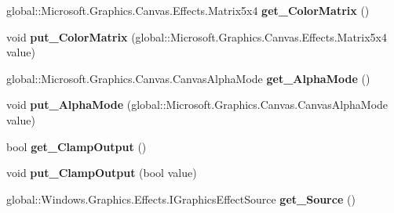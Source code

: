 \begin{DoxyCompactItemize}
global\+::\+Microsoft.\+Graphics.\+Canvas.\+Effects.\+Matrix5x4 {\bfseries get\+\_\+\+Color\+Matrix} ()
\item 
\mbox{\label{class_microsoft_1_1_graphics_1_1_canvas_1_1_effects_1_1_color_matrix_effect_a7d95e32f42f71f48b84cc81284f1023f}} 
void {\bfseries put\+\_\+\+Color\+Matrix} (global\+::\+Microsoft.\+Graphics.\+Canvas.\+Effects.\+Matrix5x4 value)
\item 
\mbox{\label{class_microsoft_1_1_graphics_1_1_canvas_1_1_effects_1_1_color_matrix_effect_abfdb6c68cffed7e33d14c5dac4b1ea80}} 
global\+::\+Microsoft.\+Graphics.\+Canvas.\+Canvas\+Alpha\+Mode {\bfseries get\+\_\+\+Alpha\+Mode} ()
\item 
\mbox{\label{class_microsoft_1_1_graphics_1_1_canvas_1_1_effects_1_1_color_matrix_effect_aecefb800adc320dde05a7b4b9ec65fe0}} 
void {\bfseries put\+\_\+\+Alpha\+Mode} (global\+::\+Microsoft.\+Graphics.\+Canvas.\+Canvas\+Alpha\+Mode value)
\item 
\mbox{\label{class_microsoft_1_1_graphics_1_1_canvas_1_1_effects_1_1_color_matrix_effect_a8f24f3336c23b20f9db23f8a09141338}} 
bool {\bfseries get\+\_\+\+Clamp\+Output} ()
\item 
\mbox{\label{class_microsoft_1_1_graphics_1_1_canvas_1_1_effects_1_1_color_matrix_effect_aef6085c7c12fe7233bd318ecd406ce13}} 
void {\bfseries put\+\_\+\+Clamp\+Output} (bool value)
\item 
\mbox{\label{class_microsoft_1_1_graphics_1_1_canvas_1_1_effects_1_1_color_matrix_effect_a53395ee86eb2e91948c5e28aa877e46a}} 
global\+::\+Windows.\+Graphics.\+Effects.\+I\+Graphics\+Effect\+Source {\bfseries get\+\_\+\+Source} ()
\item 
\mbox{\label{class_microsoft_1_1_graphics_1_1_canvas_1_1_effects_1_1_color_matrix_effect_a5c460636172b94a6c671e8882c4e86a9}} 

\end{DoxyCompactItemize}
